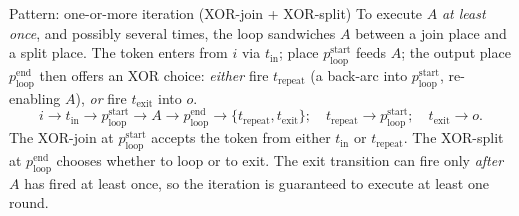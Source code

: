 \begin{examplebox}{Pattern: one-or-more iteration (XOR-join + XOR-split)}
To execute $A$ \emph{at least once}, and possibly several times, the loop sandwiches $A$ between a join place and a split place. The token enters from $i$ via $t_{\mathrm{in}}$; place $p_{\mathrm{loop}}^{\mathrm{start}}$ feeds $A$; the output place $p_{\mathrm{loop}}^{\mathrm{end}}$ then offers an XOR choice: \emph{either} fire $t_{\mathrm{repeat}}$ (a back-arc into $p_{\mathrm{loop}}^{\mathrm{start}}$, re-enabling $A$), \emph{or} fire $t_{\mathrm{exit}}$ into $o$.
\[
  i \to t_{\mathrm{in}} \to p_{\mathrm{loop}}^{\mathrm{start}} \to A \to p_{\mathrm{loop}}^{\mathrm{end}} \to \{t_{\mathrm{repeat}}, t_{\mathrm{exit}}\}; \quad t_{\mathrm{repeat}} \to p_{\mathrm{loop}}^{\mathrm{start}}; \quad t_{\mathrm{exit}} \to o.
\]
The XOR-join at $p_{\mathrm{loop}}^{\mathrm{start}}$ accepts the token from either $t_{\mathrm{in}}$ or $t_{\mathrm{repeat}}$. The XOR-split at $p_{\mathrm{loop}}^{\mathrm{end}}$ chooses whether to loop or to exit. The exit transition can fire only \emph{after} $A$ has fired at least once, so the iteration is guaranteed to execute at least one round.


\end{examplebox}
